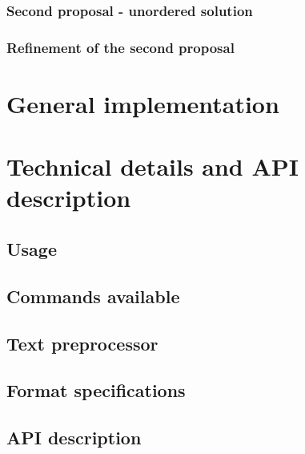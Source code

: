         \subsection{Second proposal - unordered solution} 

        \subsection{Refinement of the second proposal} 

\chapter{General implementation}

    \label{ch:implementation}

   

    

    



\chapter{Technical details and API description}
    \label{ch:faq}

    \section{Usage} 

    \section{Commands available} 

    \section{Text preprocessor} 

    \section{Format specifications}

      

    \section{API description} 

